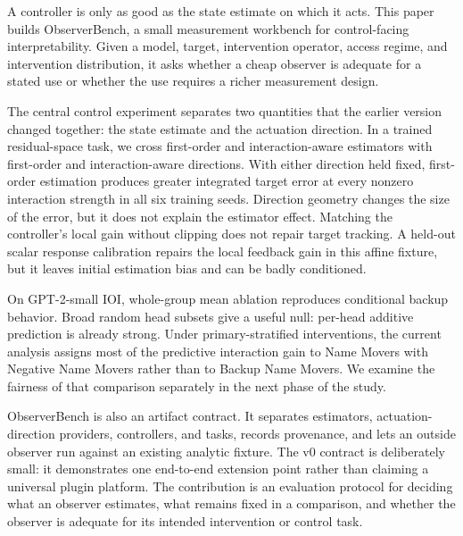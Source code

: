 A controller is only as good as the state estimate on which it acts. This
paper builds ObserverBench, a small measurement workbench for control-facing
interpretability. Given a model, target, intervention operator, access regime,
and intervention distribution, it asks whether a cheap observer is adequate
for a stated use or whether the use requires a richer measurement design.

The central control experiment separates two quantities that the earlier
version changed together: the state estimate and the actuation direction. In a
trained residual-space task, we cross first-order and interaction-aware
estimators with first-order and interaction-aware directions. With either
direction held fixed, first-order estimation produces greater integrated
target error at every nonzero interaction strength in all six training seeds.
Direction geometry changes the size of the error, but it does not explain the
estimator effect. Matching the controller's local gain without clipping does
not repair target tracking. A held-out scalar response calibration repairs the
local feedback gain in this affine fixture, but it leaves initial estimation
bias and can be badly conditioned.

On GPT-2-small IOI, whole-group mean ablation reproduces conditional backup
behavior. Broad random head subsets give a useful null: per-head additive
prediction is already strong. Under primary-stratified interventions, the
current analysis assigns most of the predictive interaction gain to Name
Movers with Negative Name Movers rather than to Backup Name Movers. We examine
the fairness of that comparison separately in the next phase of the study.

ObserverBench is also an artifact contract. It separates estimators,
actuation-direction providers, controllers, and tasks, records provenance, and
lets an outside observer run against an existing analytic fixture. The v0
contract is deliberately small: it demonstrates one end-to-end extension
point rather than claiming a universal plugin platform. The contribution is
an evaluation protocol for deciding what an observer estimates, what remains
fixed in a comparison, and whether the observer is adequate for its intended
intervention or control task.
